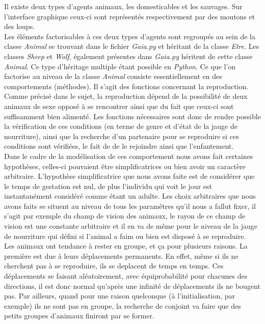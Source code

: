 \documentclass[12pt]{article}
\begin{document}
\begin{itemize}
Il existe deux types d'agents animaux, les domesticables et les sauvages. Sur 
l'interface graphique ceux-ci sont représentés respectivement par des moutons 
et des loups.\\

Les éléments factorisables à ces deux types d'agents sont 
regroupés au sein de la classe \textit{Animal} se trouvant dans le fichier 
\textit{Gaia.py} et héritant de la classe \textit{Etre}. Les classes 
\textit{Sheep} et \textit{Wolf}, également présentes dans \textit{Gaia.py}
héritent de cette classe \textit{Animal}. Ce type d'héritage multiple étant 
possible en \textit{Python}. Ce que l'on factorise au niveau de la classe 
\textit{Animal} consiste essentiellement en des comportements (méthodes). Il 
s'agit des fonctions concernant la reproduction.\\

Comme précisé dans le sujet, la reproduction dépend de la possibilité de deux 
animaux de sexe opposé à se rencontrer ainsi que du fait que ceux-ci sont 
suffisamment bien alimenté. Les fonctions nécessaires sont donc de rendre 
possible la vérification de ces conditions (en terme de genre et d'état de la 
jauge de nourriture), ainsi que la recherche d'un partenaire pour se 
reproduire si ces conditions sont vérifiées, le fait de de le rejoindre ainsi 
que l'enfantement.\\

Dans le cadre de la modélisation de ces comportement nous avons fait certaines 
hypothèses, celles-ci pouvaient être simplificatrices ou bien avoir un 
caractère arbitraire. L'hypothèse simplificatrice que nous avons faite est de 
considérer que le temps de gestation est nul, de plus l'individu qui voit le 
jour est instantanément considéré comme étant un adulte. Les choix arbitraires 
que nous avons faits se situent au niveau de tous les paramêtres qu'il nous a 
fallut fixer, il s'agit par exemple du champ de vision des animaux, le rayon 
de ce champ de vision est une constante arbitraire et il en va de même pour 
le niveau de la jauge de nourriture qui défini si l'animal a faim ou bien est 
disposé à se reproduire.\\

Les animaux ont tendance à rester en groupe, et ça pour plusieurs raisons. La 
première est due à leurs déplacements permanents. En effet, même si ils ne 
cherchent pas à se reproduire, ils se deplacent de temps en temps. Ces 
déplacements se faisant aléatoirement, avec équiprobabilité pour chacunes des 
directions, il est donc normal qu'après une infinité de déplacements ils ne 
bougent pas. Par ailleurs, quand pour une raison quelconque (à l'initialisation, 
par exemple) ils ne sont pas en groupe, la recherche de conjoint va faire que 
des petits groupes d'animaux finiront par se former.\\


\end{itemize}
\end{document}
